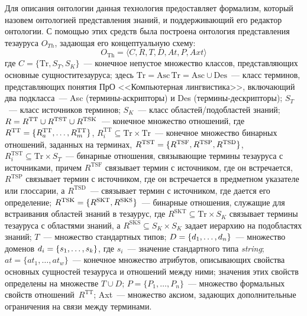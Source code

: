 \begin{multicols}{2}
  Для описания онтологии данная технология предоставляет формализм, который назовем 
онтологией представления знаний, и поддерживающий его редактор онтологии. С помощью 
этих средств была построена онтология представления тезауруса $O_{Th}$, задающая его 
концептуальную схему: 
  $$
  O_{\mathrm{Th}} =\big\langle C,R,T,D,At, P,Axt\big\rangle
  $$
  где $C=\{\mathrm{Tr}, S_T,S_K\}$~--- конечное непустое множество классов, представляющих 
основные сущности\linebreak тезауруса; здесь $\mathrm{Tr=Asc\,Tr=Asc\cup Des}$~--- класс терминов, 
представляющих понятия ПрО <<Компьютерная лингвистика>>, включающий два\linebreak 
подкласса~--- Asc (тер\-ми\-ны-аскрип\-то\-ры) и Des (тер\-ми\-ны-де\-скрип\-то\-ры); $S_T$~--- 
класс источников терминов; $S_K$~--- класс областей/подобластей знаний;
  $R\hm=R^{\mathrm{TT}}\cup R^{\mathrm{TST}}\cup R^{\mathrm{TSK}}$~--- конечное\linebreak
   множество отношений, где 
  $R^{\mathrm{TT}}\hm=\{R_a^{\mathrm{TT}},\ldots , R_m^{\mathrm{TT}}\}$, 
  $R_i^{\mathrm{TT}}\subseteq \mathrm{Tr}\times \mathrm{Tr}$~--- конечное 
множество бинарных отношений, заданных на терминах, 
  $R^{\mathrm{TST}}\hm=\{ R^{\mathrm{TSF}}, R^{\mathrm{TSP}}, R^{\mathrm{TSD}}\}$, 
  $R_i^{\mathrm{TST}}\subseteq \mathrm{Tr}\times S_T$~--- 
бинарные отношения, связывающие термины тезауруса с источниками, причем $R^{\mathrm{TSF}}$ 
связывает термин с источником, где он встречается, $R^{\mathrm{TSP}}$ связывает термин с 
источником, где он встречается в предметном указателе или глоссарии, а $R^{\mathrm{TSD}}$~--- 
связывает термин с источником, где дается его определение;
  $R^{\mathrm{TSK}}\hm=\{R^{\mathrm{SKT}},R^{\mathrm{SKS}}\}$~--- бинарные отношения, служащие для встраивания 
областей знаний в тезаурус, где $R^{\mathrm{SKT}}\subseteq \mathrm{Tr}\times S_K$ связывает термины 
тезауруса с областями знаний, а $R^{\mathrm{SKS}}\subseteq S_K\times S_K$ задает иерархию на 
подобластях знаний;
  $T$~--- множество стандартных типов;
  $D\hm=\{d_1,\ldots, d_n\}$~--- множество доменов $d_i\hm=\{s_1,\ldots, s_k\}$, где $s_i$~--- 
значение стандартного типа \textit{string}; 
  $at=\{at_1,\ldots, at_w\}$~--- конечное множество атрибутов, описывающих свойства 
основных сущностей тезауруса и отношений между ними; значения этих свойств определены 
на множестве $T\cup D$;
  $P=\{P_1,\ldots, P_n\}$~--- множество формальных свойств отношений~$R^{\mathrm{TT}}$;
  Axt~--- множество аксиом, задающих дополнительные ограничения на связи между 
терминами. 
  

\end{multicols}

